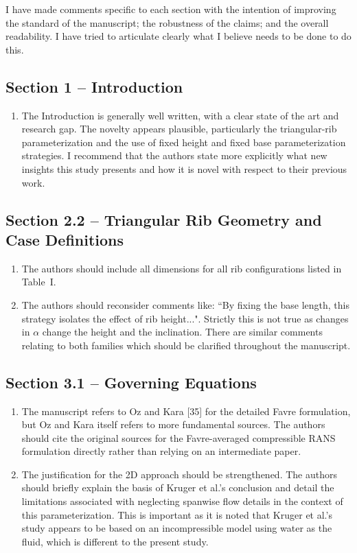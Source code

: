 \documentclass[11pt]{article}
\begin{document}
	I have made comments specific to each section with the intention of improving the standard of the manuscript; the robustness of the claims; and the overall readability. I have tried to articulate clearly what I believe needs to be done to do this.
	
	\subsection*{Section 1 -- Introduction}
	
	\begin{enumerate}
		\item The Introduction is generally well written, with a clear state of the art and research gap. The novelty appears plausible, particularly the triangular-rib parameterization and the use of fixed height and fixed base parameterization strategies. I recommend that the authors state more explicitly what new insights this study presents and how it is novel with respect to their previous work.
	\end{enumerate}
	
	\subsection*{Section 2.2 -- Triangular Rib Geometry and Case Definitions}
	
	\begin{enumerate}
		\item The authors should include all dimensions for all rib configurations listed in Table~I.
		\item The authors should reconsider comments like: ``By fixing the base length, this strategy isolates the effect of rib height...". Strictly this is not true as changes in $\alpha$ change the height and the inclination. There are similar comments relating to both families which should be clarified throughout the manuscript.
	\end{enumerate}
	
	\subsection*{Section 3.1 -- Governing Equations}
	
	\begin{enumerate}
		\item The manuscript refers to Oz and Kara [35] for the detailed Favre formulation, but Oz and Kara itself refers to more fundamental sources. The authors should cite the original sources for the Favre-averaged compressible RANS formulation directly rather than relying on an intermediate paper.
		
		\item The justification for the 2D approach should be strengthened. The authors should briefly explain the basis of Kruger et al.'s conclusion and detail the limitations associated with neglecting spanwise flow details in the context of this parameterization. This is important as it is noted that Kruger et al.'s study appears to be based on an incompressible model using water as the fluid, which is different to the present study.
	\end{enumerate}
	
\end{document}
